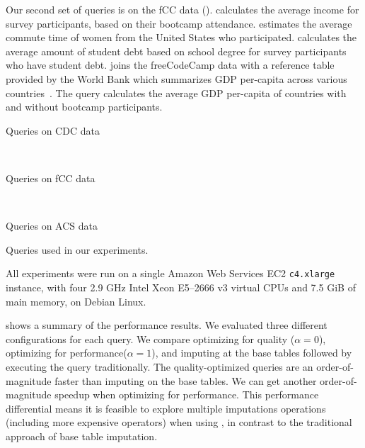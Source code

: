 Our second set of queries is on the fCC data ().
 calculates the average income for survey participants, based on their bootcamp attendance.
 estimates the average commute time of women from the United States who participated.
 calculates the average amount of student debt based on school degree for survey participants who have student debt.
 joins the freeCodeCamp data with a reference table provided by the World Bank which summarizes GDP per-capita across various countries~\cite{worldbank-data}.
The query calculates the average GDP per-capita of countries with and without bootcamp participants. 
\begin{table}
\centering
 \begin{subtable}{\linewidth}
  
  \caption{Queries on CDC data}
  \label{fig:queries-cdc}
 \end{subtable}
 ~
 \begin{subtable}{\linewidth}
 
 \caption{Queries on fCC data}
 \label{fig:queries-fcc}
 \end{subtable}
 ~
 \begin{subtable}{\linewidth}
 
 \caption{Queries on ACS data}
 \label{fig:query-acs}
 \end{subtable}

  \caption{Queries used in our experiments.}
  \label{fig:queries}
\end{table}

%  

All experiments were run on a single Amazon Web Services EC2 {\tt c4.xlarge} instance, with
four 2.9 GHz Intel Xeon E5--2666 v3 virtual CPUs and 7.5 GiB of main memory, on Debian Linux.

 shows a summary of the performance results. We evaluated three different
configurations for each query. We compare \ProjectName{} optimizing for quality ($\alpha=0$),
\ProjectName{} optimizing for performance($\alpha=1$), and imputing at the base tables followed
by executing the query traditionally. The quality-optimized queries are an order-of-magnitude
faster than imputing on the base tables. We can get another order-of-magnitude speedup when
optimizing for performance. This performance differential means it is feasible
to explore multiple imputations operations (including more expensive operators) when using
\ProjectName{}, in contrast to the traditional approach of base table imputation.

